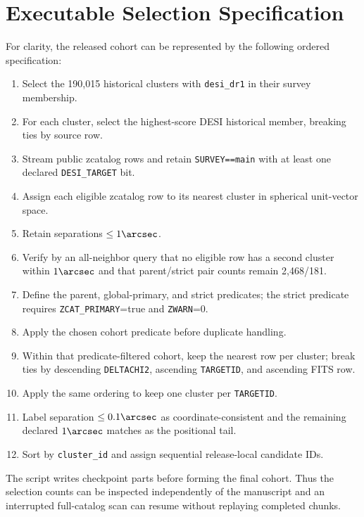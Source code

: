 \documentclass[twocolumn]{aastex701}
\begin{document}
\clearpage
\appendix

\section{Executable Selection Specification}\label{app:selection}

For clarity, the released cohort can be represented by the following ordered specification:
\begin{enumerate}
\item Select the 190,015 historical clusters with \texttt{desi\_dr1} in their survey membership.
\item For each cluster, select the highest-score DESI historical member, breaking ties by source row.
\item Stream public zcatalog rows and retain
\texttt{SURVEY==main} with at least one declared \texttt{DESI\_TARGET} bit.
\item Assign each eligible zcatalog row to its nearest cluster in spherical unit-vector space.
\item Retain separations $\le1\arcsec$.
\item Verify by an all-neighbor query that no eligible row has a second cluster within
$1\arcsec$ and that parent/strict pair counts remain 2,468/181.
\item Define the parent, global-primary, and strict predicates; the strict predicate requires
\texttt{ZCAT\_PRIMARY}=true and \texttt{ZWARN}=0.
\item Apply the chosen cohort predicate before duplicate handling.
\item Within that predicate-filtered cohort, keep the nearest row per cluster; break ties by descending
\texttt{DELTACHI2}, ascending \texttt{TARGETID}, and ascending FITS row.
\item Apply the same ordering to keep one cluster per \texttt{TARGETID}.
\item Label separation $\le0.1\arcsec$ as coordinate-consistent and the remaining declared
$1\arcsec$ matches as the positional tail.
\item Sort by \texttt{cluster\_id} and assign sequential release-local candidate IDs.
\end{enumerate}

The script writes checkpoint parts before forming the final cohort.  Thus the selection counts
can be inspected independently of the manuscript and an interrupted full-catalog scan can resume
without replaying completed chunks.
\end{document}
